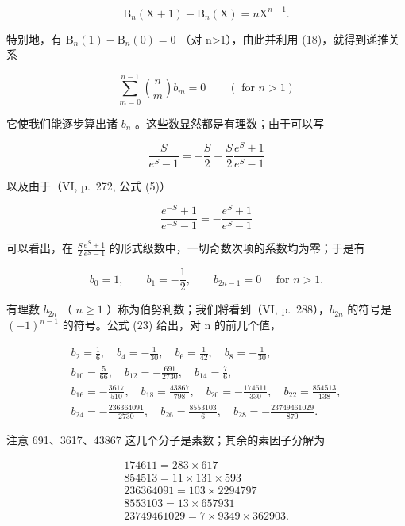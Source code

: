 \[
\mathrm{B} _ {n} (\mathrm{X} + 1) - \mathrm{B} _ {n} (\mathrm{X}) = n \mathrm{X} ^ {n - 1}.\tag{22}
\]

特别地，有 \(\mathrm{B}_{n}(1)-\mathrm{B}_{n}(0)=0\) （对 n\textgreater1），由此并利用 (18)，就得到递推关系

\[
\sum_ {m = 0} ^ {n - 1} \binom {n} {m} b _ {m} = 0 \qquad (\text { for } n > 1)\tag{23}
\]

它使我们能逐步算出诸 \(b_{n}\) 。这些数显然都是有理数；由于可以写

\[
{\frac {S}{e ^ {S} - 1}} = - {\frac {S}{2}} + {\frac {S}{2}} {\frac {e ^ {S} + 1}{e ^ {S} - 1}}
\]

以及由于（VI, p.~272, 公式 (5)）

\[
\frac {e ^ {- S} + 1}{e ^ {- S} - 1} = - \frac {e ^ {S} + 1}{e ^ {S} - 1}
\]

可以看出，在 \(\frac{S}{2}\frac{e^{S}+1}{e^{S}-1}\) 的形式级数中，一切奇数次项的系数均为零；于是有

\[
b _ {0} = 1, \qquad b _ {1} = - \frac {1}{2}, \qquad b _ {2 n - 1} = 0 \quad \text { for } n > 1.\tag{24}
\]

有理数 \(b_{2n}\) （ \(n \geqslant 1\) ）称为伯努利数；我们将看到（VI, p.~288），\(b_{2n}\) 的符号是 \((-1)^{n-1}\) 的符号。公式 (23) 给出，对 n 的前几个值，

\[
\begin{array}{c} b _ {2} = \frac {1}{6}, \quad b _ {4} = - \frac {1}{3 0}, \quad b _ {6} = \frac {1}{4 2}, \quad b _ {8} = - \frac {1}{3 0}, \\ b _ {1 0} = \frac {5}{6 6}, \quad b _ {1 2} = - \frac {6 9 1}{2 7 3 0}, \quad b _ {1 4} = \frac {7}{6}, \\ b _ {1 6} = - \frac {3 6 1 7}{5 1 0}, \quad b _ {1 8} = \frac {4 3 8 6 7}{7 9 8}, \quad b _ {2 0} = - \frac {1 7 4 6 1 1}{3 3 0}, \quad b _ {2 2} = \frac {8 5 4 5 1 3}{1 3 8}, \\ b _ {2 4} = - \frac {2 3 6 3 6 4 0 9 1}{2 7 3 0}, \quad b _ {2 6} = \frac {8 5 5 3 1 0 3}{6}, \quad b _ {2 8} = - \frac {2 3 7 4 9 4 6 1 0 2 9}{8 7 0}. \end{array}
\]

注意 691、3617、43867 这几个分子是素数；其余的素因子分解为

\[
\begin{array}{c} 1 7 4 6 1 1 = 2 8 3 \times 6 1 7 \\ 8 5 4 5 1 3 = 1 1 \times 1 3 1 \times 5 9 3 \\ 2 3 6 3 6 4 0 9 1 = 1 0 3 \times 2 2 9 4 7 9 7 \\ 8 5 5 3 1 0 3 = 1 3 \times 6 5 7 9 3 1 \\ 2 3 7 4 9 4 6 1 0 2 9 = 7 \times 9 3 4 9 \times 3 6 2 9 0 3. \end{array}
\]

